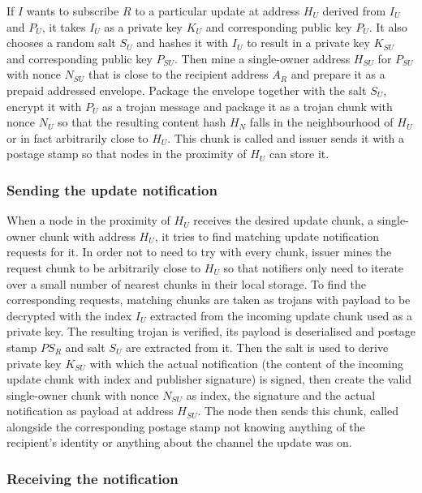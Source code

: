 If $I$  wants to subscribe $R$ to a  particular update at address $H_U$ derived from $I_U$ and $P_U$, it takes $I_U$ as a private key $K_U$ and corresponding public key $P_U$. It also chooses a random salt $S_U$ and hashes it with $I_U$ to result in a private key $K_{SU}$ and corresponding public key $P_{SU}$. Then mine a single-owner address $H_{SU}$ for $P_{SU}$ with nonce $N_{SU}$ that is close to the recipient address $A_R$ and prepare it as a prepaid addressed envelope. Package the envelope together with the salt $S_U$, encrypt it with $P_U$ as a trojan message and
package it as a trojan chunk with nonce $N_U$ so that the resulting content hash $H_N$ falls in the neighbourhood of $H_U$ or in fact arbitrarily close to $H_U$. This chunk is called  and issuer sends it with a postage stamp so that nodes in the proximity of $H_U$ can store it.


\subsubsection{Sending the update notification}

When a node in the proximity of $H_U$ receives the desired update chunk, a single-owner chunk with address $H_U$, it tries to find matching update notification requests for it. In order not to need to try with every chunk, issuer mines the request chunk to be arbitrarily close to $H_U$ so that notifiers only need to iterate over a small number of nearest chunks in their local storage. To find the corresponding requests, matching chunks are taken as trojans with payload to be decrypted with the index $I_U$ extracted from the incoming update chunk used as a private key. The resulting trojan is verified, its payload is deserialised and postage stamp $PS_R$ and salt $S_U$ are extracted from it. Then the salt is used to derive private key $K_{SU}$ with which the actual notification (the content of the incoming update chunk with index and publisher signature) is signed, then create the valid single-owner chunk with nonce $N_{SU}$ as index, the signature and the actual notification as payload at address $H_{SU}$. The node then sends this chunk, called  alongside the corresponding postage stamp not knowing anything of the recipient's identity or anything about the channel the update was on.


\subsubsection{Receiving the notification}

